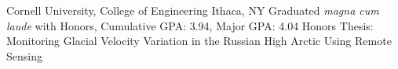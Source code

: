 
        {Cornell University, College of Engineering}
        {Ithaca, NY}
        {Graduated \textit{magna cum laude} with Honors, Cumulative GPA: 3.94, Major GPA: 4.04}
        {Honors Thesis: Monitoring Glacial Velocity Variation in the Russian High Arctic Using Remote Sensing}
